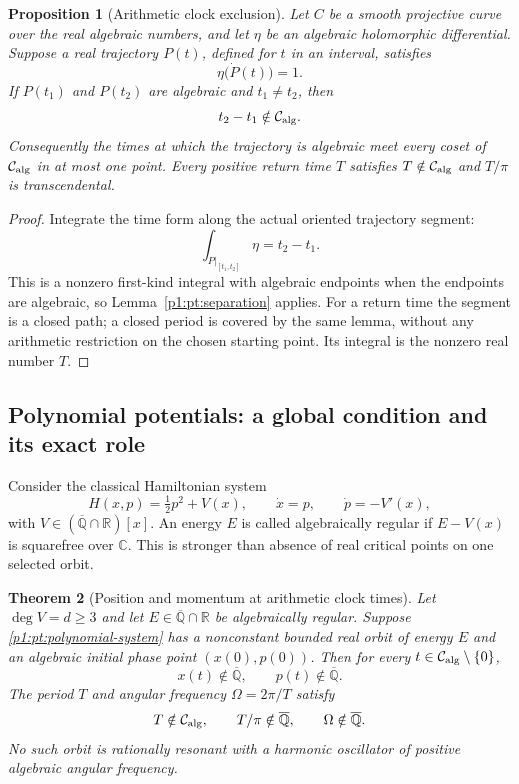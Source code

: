\documentclass[11pt,a4paper]{article}
\newtheorem{theorem}{Theorem}[section]
\newtheorem{proposition}[theorem]{Proposition}
\theoremstyle{definition}
\theoremstyle{remark}
\numberwithin{equation}{section}
\begin{document}
\begin{proposition}[Arithmetic clock exclusion]
\label{p1:pt:clock-principle}
Let $C$ be a smooth projective curve over the real algebraic numbers,
and let $\eta$ be an algebraic holomorphic differential.  Suppose a real
trajectory $P(t)$, defined for $t$ in an interval, satisfies
\[
 \eta\bigl(\dot P(t)\bigr)=1.
\]
If $P(t_1)$ and $P(t_2)$ are algebraic and $t_1\ne t_2$, then
\[
 t_2-t_1\notin\mathcal C_{\rm alg}.
\]
Consequently the times at which the trajectory is algebraic meet every
coset of $\mathcal C_{\rm alg}$ in at most one point.
Every positive return time $T$ satisfies
$T\notin\mathcal C_{\rm alg}$ and $T/\pi$ is transcendental.
\end{proposition}

\begin{proof}
Integrate the time form along the actual oriented trajectory segment:
\[
 \int_{P|_{[t_1,t_2]}}\eta=t_2-t_1.
\]
This is a nonzero first-kind integral with algebraic endpoints when
the endpoints are algebraic, so Lemma~\ref{p1:pt:separation} applies.
For a return time the segment is a closed path; a closed period is
covered by the same lemma, without any arithmetic restriction on the
chosen starting point.  Its integral is the nonzero real number $T$.
\end{proof}

\subsection{Polynomial potentials: a global condition and its exact role}

Consider the classical Hamiltonian system
\begin{equation}\label{p1:pt:polynomial-system}
 H(x,p)=\tfrac12p^2+V(x),\qquad
 \dot x=p,\qquad \dot p=-V'(x),
\end{equation}
with $V\in(\overline{\mathbb Q}\cap\mathbb R)[x]$.
An energy $E$ is called algebraically regular if $E-V(x)$ is
squarefree over $\mathbb C$.  This is stronger than absence of real
critical points on one selected orbit.

\begin{theorem}[Position and momentum at arithmetic clock times]
\label{p1:pt:polynomial-clocks}
Let $\deg V=d\ge3$ and let $E\in\overline{\mathbb Q}\cap\mathbb R$
be algebraically regular.  Suppose
\eqref{p1:pt:polynomial-system} has a nonconstant bounded real orbit of
energy $E$ and an algebraic initial phase point $(x(0),p(0))$.
Then for every $t\in\mathcal C_{\rm alg}\setminus\{0\}$,
\[
 x(t)\notin\overline{\mathbb Q},\qquad
 p(t)\notin\overline{\mathbb Q}.
\]
The period $T$ and angular frequency $\Omega=2\pi/T$ satisfy
\[
 T\notin\mathcal C_{\rm alg},\qquad
 T/\pi\notin\overline{\mathbb Q},\qquad
 \Omega\notin\overline{\mathbb Q}.
\]
No such orbit is rationally resonant with a harmonic oscillator of
positive algebraic angular frequency.
\end{theorem}
\end{document}
